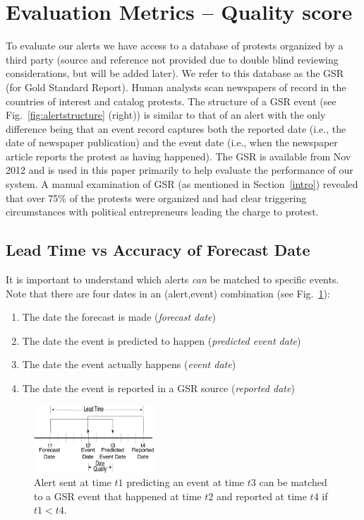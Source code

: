 \section{Evaluation Metrics -- Quality score}
To evaluate our alerts we have access to a database of protests organized by a third party (source and reference
not provided due to double blind reviewing considerations, but will be added later). We refer to this database as the
GSR (for Gold Standard Report). Human analysts scan newspapers of record in the countries of interest and catalog
protests. The structure of a GSR event (see Fig.~\ref{fig:alertstructure} (right)) is similar to that of an alert with
the only difference being that an event record captures both the reported date (i.e., the date of newspaper publication)
and the event date (i.e., when the newspaper article reports the protest as having happened).
The GSR is available from Nov 2012 
and is used in this paper primarily to 
help evaluate the performance of our system. A manual examination of GSR (as mentioned in Section~\ref{intro}) revealed
that over 75\% of the protests were organized and had clear triggering circumstances with political entrepreneurs leading the
charge to protest.

\subsection{Lead Time vs Accuracy of Forecast Date}
It is important to understand which alerts {\it can} be matched to specific events.
Note that there are four dates in an (alert,event) combination (see Fig.~\ref{fig:timeline}):
\begin{enumerate}
\item The date the forecast is made ({\it forecast date})
\item The date the event is predicted to happen ({\it predicted event date})
\item The date the event actually happens ({\it event date})
\item The date the event is reported in a GSR source ({\it reported date})
\end{enumerate}

\begin{figure}[t]
\centering
\includegraphics[width=0.40\textwidth]{figures/timeline}
\caption[Timeline depicting lead-time vs date accuracy]{Alert sent at time $t1$ predicting an event at time $t3$
can be matched to a GSR event that happened at time $t2$ and reported
at time $t4$ if $t1 < t4$.}
\label{fig:timeline}
\end{figure}


